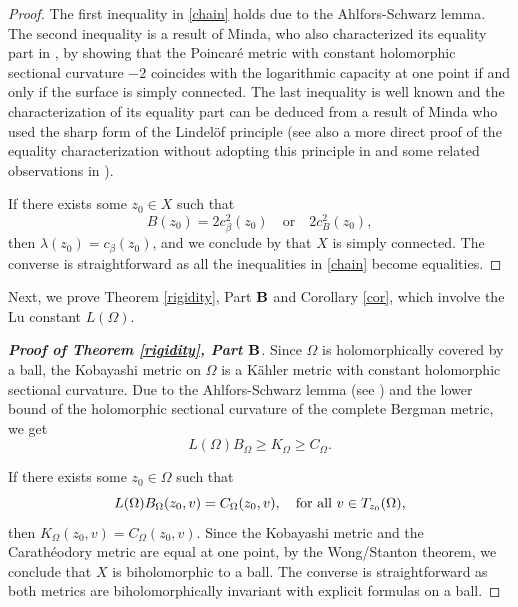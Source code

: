 \documentclass[12pt] {article}
\numberwithin{equation}{section}
\begin{document}
\begin{proof}  


The first inequality in \eqref{chain} holds due to the Ahlfors-Schwarz lemma. The second inequality is a result of Minda, who also characterized its equality part in \cite{Min},
by showing that  the Poincar\'e metric with constant  holomorphic sectional curvature  \(-2\)  coincides with the logarithmic capacity at one point  if and only if the surface is simply connected.
The last inequality is well known and the characterization of its equality part can be deduced from a result of Minda \cite{Min} who used the sharp form of the Lindel\"of principle (see also a more direct proof of the equality characterization without adopting this principle in \cite{DTZ} and some related observations in \cite{D}).

\medskip

If there exists some $z_0 \in X$ such that 
$$
B(z_0) = 2 c^2_\beta(z_0) \quad \text{or} \quad 2 c^2_B(z_0),
$$
then $\lambda (z_0) = c_\beta(z_0)$, and we conclude by \cite{Min} that $X$ is simply connected. The converse is straightforward as all the inequalities in \eqref{chain} become equalities.


 
  

 






\end{proof}






  



        \medskip

Next, we prove Theorem \ref{rigidity}, Part {$\bf B$} and Corollary \ref{cor}, which involve the Lu constant $L(\Omega)$. 


        \medskip

        
\begin{proof} [{\bf Proof of Theorem \ref{rigidity}, Part {$\bf B$}}]


Since $\Omega$ is holomorphically covered by a ball, the Kobayashi metric   on $\Omega$ is a K\"ahler metric with constant holomorphic sectional curvature.
Due to the  Ahlfors-Schwarz lemma  (see \cite{Ahlfors, Roy, Yau78,Lu1979}) and 
the lower bound of the holomorphic sectional curvature of the complete Bergman metric, we get 
$$
L(\Omega) B_\Omega \geq K_\Omega \geq C_\Omega.
$$
 

 

\medskip


If there exists some $z_0 \in \Omega$ such that 
$$
L(\Omega) B_\Omega(z_0, v) =  C_\Omega(z_0, v),  \quad \text{for all\,} \, v\in T_{z_0}(\Omega),
$$
then $K_\Omega (z_0, v) =C_\Omega(z_0, v)$.
Since the Kobayashi metric and the Carath\'eodory metric are equal at one point,
by   the  Wong/Stanton theorem, we conclude that $X$ is biholomorphic to a ball.
  The converse is straightforward as both metrics are biholomorphically invariant with explicit formulas on a ball.

 


\end{proof}
\end{document}
